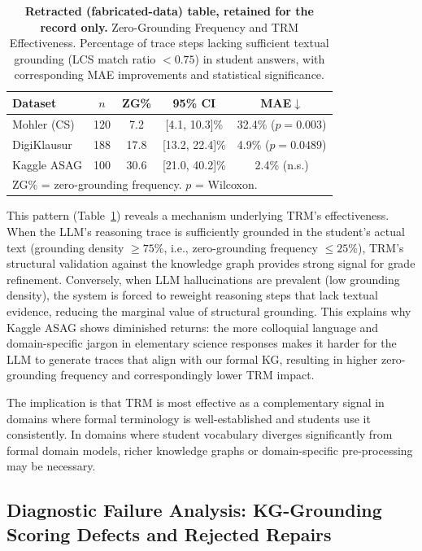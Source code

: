 \documentclass[conference]{IEEEtran}
\begin{document}
\begin{table}[h]
\caption{\textbf{Retracted (fabricated-data) table, retained for the record only.}
         Zero-Grounding Frequency and TRM Effectiveness. Percentage of trace steps
         lacking sufficient textual grounding (LCS match ratio $< 0.75$) in student
         answers, with corresponding MAE improvements and statistical significance.}
\label{tab:grounding_density}
\centering
\footnotesize
\begin{tabular}{lcccc}
\toprule
\textbf{Dataset} & \textbf{$n$} & \textbf{ZG\%} & \textbf{95\% CI} &
\textbf{MAE$\downarrow$} \\
\midrule
Mohler (CS)  & 120 & 7.2  & [4.1, 10.3]\%  & 32.4\% ($p{=}0.003$) \\
DigiKlausur  & 188 & 17.8 & [13.2, 22.4]\% & 4.9\% ($p{=}0.0489$) \\
Kaggle ASAG  & 100 & 30.6 & [21.0, 40.2]\% & 2.4\% (n.s.) \\
\bottomrule
\multicolumn{5}{l}{ZG\% = zero-grounding frequency. $p$ = Wilcoxon.}
\end{tabular}
\end{table}

This pattern (Table~\ref{tab:grounding_density}) reveals a mechanism underlying TRM's
effectiveness. When the LLM's reasoning trace is sufficiently grounded in the
student's actual text (grounding density $\geq 75\%$, i.e., zero-grounding frequency
$\leq 25\%$), TRM's structural validation against the knowledge graph provides
strong signal for grade refinement. Conversely, when LLM hallucinations
are prevalent (low grounding density), the system is forced to reweight reasoning
steps that lack textual evidence, reducing the marginal value of structural
grounding. This explains why Kaggle ASAG shows diminished returns: the more
colloquial language and domain-specific jargon in elementary science responses
makes it harder for the LLM to generate traces that align with our formal KG,
resulting in higher zero-grounding frequency and correspondingly lower TRM impact.

The implication is that TRM is most effective as a complementary signal in domains
where formal terminology is well-established and students use it consistently. In
domains where student vocabulary diverges significantly from formal domain models,
richer knowledge graphs or domain-specific pre-processing may be necessary.

\subsection{Diagnostic Failure Analysis: KG-Grounding Scoring Defects and Rejected Repairs}
\label{subsec:diagnostic_failure}
\end{document}
